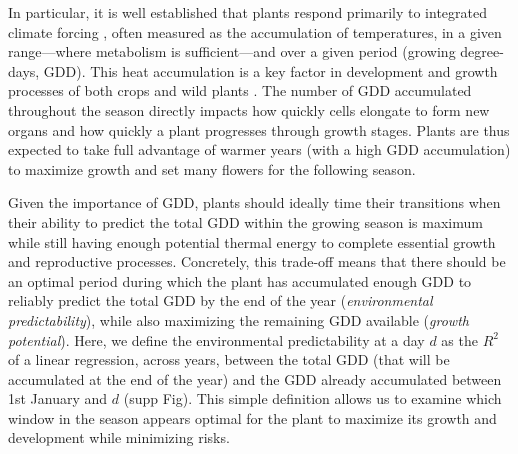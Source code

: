 \documentclass[11pt,letter]{article}
\begin{document}
In particular, it is well established that plants respond primarily to integrated climate forcing \citep{Chuine2017}, often measured as the accumulation of temperatures, in a given range---where metabolism is sufficient---and over a given period (growing degree-days, GDD). This heat accumulation is a key factor in development and growth processes of both crops \citep[e.g.][]{Cross1972} and wild plants \citep[e.g.][]{Hunter1992}. The number of GDD accumulated throughout the season directly impacts how quickly cells elongate to form new organs and how quickly a plant progresses through growth stages. Plants are thus expected to take full advantage of warmer years (with a high GDD accumulation) to maximize growth and set many flowers for the following season.

Given the importance of GDD, plants should ideally time their transitions when their ability to predict the total GDD within the growing season is maximum while still having enough potential thermal energy to complete essential growth and reproductive processes. Concretely, this trade-off means that there should be an optimal period during which the plant has accumulated enough GDD to reliably predict the total GDD by the end of the year (\emph{environmental predictability}), while also maximizing the remaining GDD available (\emph{growth potential}). Here, we define the environmental predictability at a day $d$ as the $R^2$ of a linear regression, across years, between the total GDD (that will be accumulated at the end of the year) and the GDD already accumulated between 1st January and $d$ (supp Fig). 
This simple definition allows us to examine which window in the season appears optimal for the plant to maximize its growth and development while minimizing risks.
\end{document}
